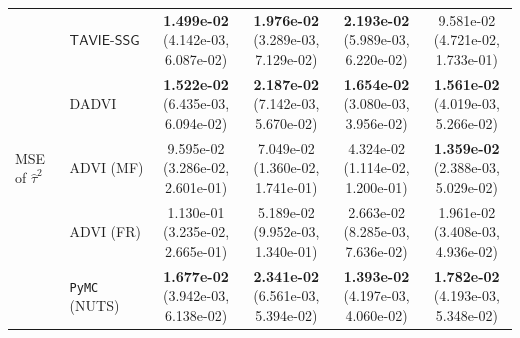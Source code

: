 \documentclass[12pt]{article}
\numberwithin{equation}{section}
\newcommand{\tssg}{\mathsf{TAVIE}\text{-}\mathsf{SSG}}
\begin{document}
{\begin{longtable}{llcccc}
\multirow{5}{*}{MSE of $\widehat{\tau}^{2}$}
& $\tssg$ & \makecell[c]{\textbf{1.499e-02}\\(4.142e-03, 6.087e-02)} & \makecell[c]{\textbf{1.976e-02}\\(3.289e-03, 7.129e-02)} & \makecell[c]{\textbf{2.193e-02}\\(5.989e-03, 6.220e-02)} & \makecell[c]{9.581e-02\\(4.721e-02, 1.733e-01)} \\
& DADVI & \makecell[c]{\textbf{1.522e-02}\\(6.435e-03, 6.094e-02)} & \makecell[c]{\textbf{2.187e-02}\\(7.142e-03, 5.670e-02)} & \makecell[c]{\textbf{1.654e-02}\\(3.080e-03, 3.956e-02)} & \makecell[c]{\textbf{1.561e-02}\\(4.019e-03, 5.266e-02)} \\
& ADVI (MF) & \makecell[c]{9.595e-02\\(3.286e-02, 2.601e-01)} & \makecell[c]{7.049e-02\\(1.360e-02, 1.741e-01)} & \makecell[c]{4.324e-02\\(1.114e-02, 1.200e-01)} & \makecell[c]{\textbf{1.359e-02}\\(2.388e-03, 5.029e-02)} \\
& ADVI (FR) & \makecell[c]{1.130e-01\\(3.235e-02, 2.665e-01)} & \makecell[c]{5.189e-02\\(9.952e-03, 1.340e-01)} & \makecell[c]{2.663e-02\\(8.285e-03, 7.636e-02)} & \makecell[c]{1.961e-02\\(3.408e-03, 4.936e-02)} \\
& \texttt{PyMC} (NUTS) & \makecell[c]{\textbf{1.677e-02}\\(3.942e-03, 6.138e-02)} & \makecell[c]{\textbf{2.341e-02}\\(6.561e-03, 5.394e-02)} & \makecell[c]{\textbf{1.393e-02}\\(4.197e-03, 4.060e-02)} & \makecell[c]{\textbf{1.782e-02}\\(4.193e-03, 5.348e-02)} \\
\hline


\end{longtable}}
\end{document}
